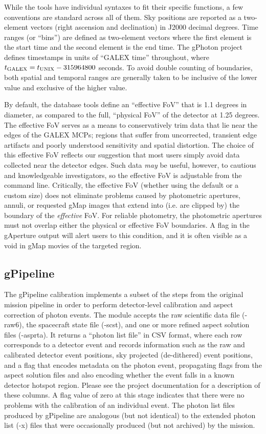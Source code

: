 \documentclass[preprint]{aastex}
\begin{document}
While the tools have individual syntaxes to fit their specific functions, a few conventions are standard across all of them. Sky positions are reported as a two-element vectors (right ascension and declination) in J2000 decimal degrees. Time ranges (or ``bins'') are defined as two-element vectors where the first element is the start time and the second element is the end time. The gPhoton project defines timestamps in units of ``GALEX time'' throughout, where $t_{\rm{GALEX}} = t_{\rm{UNIX}} - 315964800$ seconds. To avoid double counting of boundaries, both spatial and temporal ranges are generally taken to be inclusive of the lower value and exclusive of the higher value.

By default, the database tools define an ``effective FoV'' that is 1.1 degrees in diameter, as compared to the full, ``physical FoV'' of the detector at 1.25 degrees. The effective FoV serves as a means to conservatively trim data that lie near the edges of the GALEX MCPs; regions that suffer from uncorrected, transient edge artifacts and poorly understood sensitivity and spatial distortion. The choice of this effective FoV reflects our suggestion that most users simply avoid data collected near the detector edges. Such data \emph{may} be useful, however, to cautious and knowledgeable investigators, so the effective FoV is adjustable from the command line. Critically, the effective FoV (whether using the default or a custom size) does not eliminate problems caused by photometric apertures, annuli, or requested gMap images that extend into (i.e. are clipped by) the boundary of the \emph{effective} FoV. For reliable photometry, the photometric apertures must not overlap either the physical or effective FoV boundaries. A flag in the gAperture output will alert users to this condition, and it is often visible as a void in gMap movies of the targeted region.

\subsection{gPipeline}
The gPipeline calibration implements a subset of the steps from the original mission pipeline in order to perform detector-level calibration and aspect correction of photon events. The module accepts the raw scientific data file (-raw6), the spacecraft state file (-scst), and one or more refined aspect solution files (-asprta). It returns a ``photon list file'' in CSV format, where each row corresponds to a detector event and records information such as the raw and calibrated detector event positions, sky projected (de-dithered) event positions, and a flag that encodes metadata on the photon event, propagating flags from the aspect solution files and also encoding whether the event falls in a known detector hotspot region. Please see the project documentation for a description of these columns. A flag value of zero at this stage indicates that there were no problems with the calibration of an individual event. The photon list files produced by gPipeline are analogous (but not identical) to the extended photon list (-x) files that were occasionally produced (but not archived) by the mission.
\end{document}
